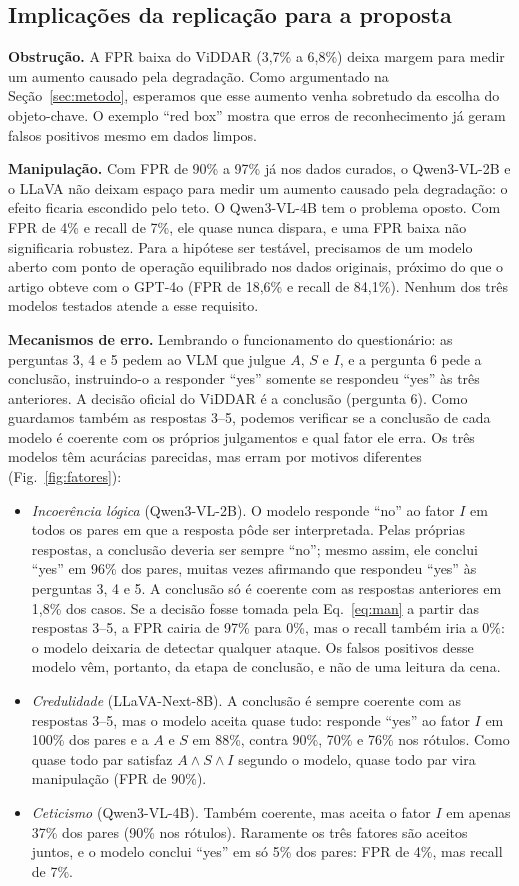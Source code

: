 \documentclass[journal,onecolumn]{IEEEtran}
\begin{document}
\subsection{Implicações da replicação para a proposta}
\textbf{Obstrução.} A FPR baixa do ViDDAR (3,7\% a 6,8\%) deixa margem para medir um aumento causado
pela degradação. Como argumentado na Seção~\ref{sec:metodo}, esperamos que esse aumento venha
sobretudo da escolha do objeto-chave. O exemplo ``red box'' mostra que erros de reconhecimento já
geram falsos positivos mesmo em dados limpos.

\textbf{Manipulação.} Com FPR de 90\% a 97\% já nos dados curados, o Qwen3-VL-2B e o LLaVA não deixam
espaço para medir um aumento causado pela degradação: o efeito ficaria escondido pelo teto. O
Qwen3-VL-4B tem o problema oposto. Com FPR de 4\% e recall de 7\%, ele quase nunca dispara, e uma FPR
baixa não significaria robustez. Para a hipótese ser testável, precisamos de um modelo aberto com ponto
de operação equilibrado nos dados originais, próximo do que o artigo obteve com o GPT-4o (FPR de 18,6\%
e recall de 84,1\%). Nenhum dos três modelos testados atende a esse requisito.

\textbf{Mecanismos de erro.} Lembrando o funcionamento do questionário: as perguntas 3, 4 e 5 pedem ao
VLM que julgue $A$, $S$ e $I$, e a pergunta 6 pede a conclusão, instruindo-o a responder ``yes'' somente
se respondeu ``yes'' às três anteriores. A decisão oficial do ViDDAR é a conclusão (pergunta 6). Como
guardamos também as respostas 3--5, podemos verificar se a conclusão de cada modelo é coerente com
os próprios julgamentos e qual fator ele erra. Os três modelos têm acurácias parecidas, mas erram por
motivos diferentes (Fig.~\ref{fig:fatores}):
\begin{itemize}
\item \emph{Incoerência lógica} (Qwen3-VL-2B). O modelo responde ``no'' ao fator $I$ em todos os pares
  em que a resposta pôde ser interpretada. Pelas próprias respostas, a conclusão deveria ser sempre
  ``no''; mesmo assim, ele conclui ``yes'' em 96\% dos pares, muitas vezes afirmando que respondeu
  ``yes'' às perguntas 3, 4 e 5. A conclusão só é coerente com as respostas anteriores em 1,8\% dos
  casos. Se a decisão fosse tomada pela Eq.~\eqref{eq:man} a partir das respostas 3--5, a FPR cairia
  de 97\% para 0\%, mas o recall também iria a 0\%: o modelo deixaria de detectar qualquer ataque. Os
  falsos positivos desse modelo vêm, portanto, da etapa de conclusão, e não de uma leitura da cena.
\item \emph{Credulidade} (LLaVA-Next-8B). A conclusão é sempre coerente com as respostas 3--5, mas o
  modelo aceita quase tudo: responde ``yes'' ao fator $I$ em 100\% dos pares e a $A$ e $S$ em 88\%,
  contra 90\%, 70\% e 76\% nos rótulos. Como quase todo par satisfaz $A\wedge S\wedge I$ segundo o
  modelo, quase todo par vira manipulação (FPR de 90\%).
\item \emph{Ceticismo} (Qwen3-VL-4B). Também coerente, mas aceita o fator $I$ em apenas 37\% dos pares
  (90\% nos rótulos). Raramente os três fatores são aceitos juntos, e o modelo conclui ``yes'' em só 5\%
  dos pares: FPR de 4\%, mas recall de 7\%.
\end{itemize}
\end{document}
